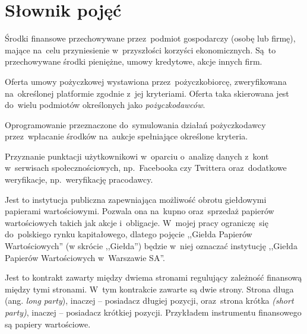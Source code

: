 \documentclass[a4paper,twoside,titlepage,openright]{book}
\begin{document}
\chapter*{Słownik pojęć}
\begin{description}[style=nextline]
	\item[Aktywa finansowe] Środki finansowe przechowywane przez~podmiot gospodarczy (osobę lub firmę), mające na~celu przyniesienie w~przyszłości korzyści ekonomicznych. Są~to przechowywane środki pieniężne, umowy kredytowe, akcje innych firm.
	\item[Aukcja pożyczkowa] Oferta umowy pożyczkowej wystawiona przez~pożyczkobiorcę, zweryfikowana na~określonej platformie zgodnie z~jej kryteriami. Oferta taka skierowana jest do~wielu podmiotów określonych jako \textit{pożyczkodawców}.
	\item[Automat inwestycyjny] Oprogramowanie przeznaczone do~symulowania działań pożyczkodawcy przez~wpłacanie środków na~aukcje spełniające określone kryteria.
	\item[FriendlyScore] Przyznanie punktacji użytkownikowi w~oparciu o~analizę danych z~kont w~serwisach społecznościowych, np.~Facebooka czy Twittera oraz~dodatkowe weryfikacje, np.~weryfikację pracodawcy.
	\item[Giełda Papierów Wartościowych] Jest to instytucja publiczna zapewniająca możliwość obrotu giełdowymi papierami wartościowymi. Pozwala ona na~kupno oraz~sprzedaż papierów wartościowych takich jak akcje i~obligacje. W~mojej pracy ograniczę~się do~polskiego rynku kapitałowego, dlatego pojęcie ,,Giełda Papierów Wartościowych'' (w skrócie ,,Giełda'') będzie w~niej oznaczać instytucję ,,Giełda Papierów Wartościowych w~Warszawie SA''.
	\item[Instrument finansowy (ang. \textit{financial instrument})]  Jest to kontrakt zawarty między dwiema stronami regulujący zależność finansową między tymi stronami. W~tym kontrakcie zawarte są dwie strony. Strona długa (ang. \textit{long party}), inaczej -- posiadacz długiej pozycji, oraz~strona krótka \textit{(short party)}, inaczej -- posiadacz krótkiej pozycji. Przykładem instrumentu finansowego są papiery wartościowe. \cite{inwestycje}

\end{description}
\end{document}
